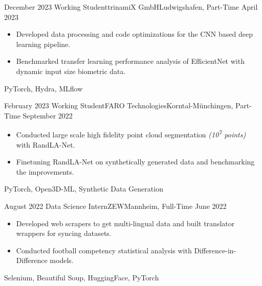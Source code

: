 \begin{experiences}
  \experience
    {December 2023} {Working Student}{trinamiX GmbH}{Ludwigshafen, Part-Time}
    {April 2023}    {
                      \begin{itemize}
                        \item{Developed data processing and code optimizations for the CNN based deep learning pipeline.}
                        \item {Benchmarked transfer learning performance analysis of EfficientNet with dynamic input size biometric data.}
                      \end{itemize}
                    }
                    {PyTorch, Hydra, MLflow}
  \emptySeparator
  
  \experience
    {February 2023} {Working Student}{FARO Technologies}{Korntal-Münchingen, Part-Time}
    {September 2022}    {
                      \begin{itemize}
                        \item{Conducted large scale high fidelity point cloud segmentation \textit{(10\textsuperscript{7} points)} with RandLA-Net.}
                        \item {Finetuning RandLA-Net on synthetically generated data and benchmarking the improvements.}
                      \end{itemize}
                    }
                    {PyTorch, Open3D-ML, Synthetic Data Generation}
  \emptySeparator
  
  \experience
    {August 2022} {Data Science Intern}{ZEW}{Mannheim, Full-Time}
    {June 2022}    {
                      \begin{itemize}
                        \item{Developed web scrapers to get multi-lingual data and built translator wrappers for syncing datasets.}
                        \item{Conducted football competency statistical analysis with Difference-in-Difference models.}
                      \end{itemize}
                    }
                    {Selenium, Beautiful Soup, HuggingFace, PyTorch}
  \emptySeparator


\end{experiences}
